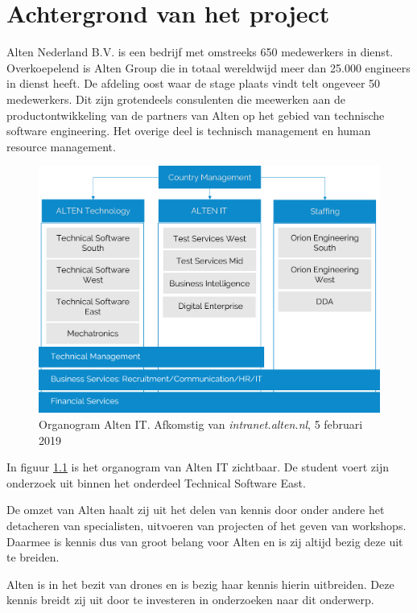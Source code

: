\documentclass[a4paper, 11pt, oneside]{report}
\begin{document}
\chapter{Achtergrond van het project}
\label{chapter:achtergrond}
Alten Nederland B.V. is een bedrijf met omstreeks 650 medewerkers in dienst. 
Overkoepelend is Alten Group die in totaal wereldwijd meer dan 25.000 engineers in dienst heeft.
De afdeling oost waar de stage plaats vindt telt ongeveer 50 medewerkers. 
Dit zijn grotendeels consulenten die meewerken aan de productontwikkeling van de partners van Alten op het gebied van technische software engineering.
Het overige deel is technisch management en human resource management.
\begin{figure}[H]
	\begin{center}\includegraphics[scale=0.18]{organogram}\end{center}
	\caption{Organogram Alten IT. Afkomstig van \textit{intranet.alten.nl}, 5 februari 2019 }
	\label{fig:organogram}
\end{figure}

In figuur \ref{fig:organogram} is het organogram van Alten IT zichtbaar.
De student voert zijn onderzoek uit binnen het onderdeel Technical Software East.

De omzet van Alten haalt zij uit het delen van kennis door onder andere het detacheren van specialisten, uitvoeren van projecten of het geven van workshops.
Daarmee is kennis dus van groot belang voor Alten en is zij altijd bezig deze uit te breiden. 

Alten is in het bezit van drones en is bezig haar kennis hierin uitbreiden.
Deze kennis breidt zij uit door te investeren in onderzoeken naar dit onderwerp.
\end{document}

